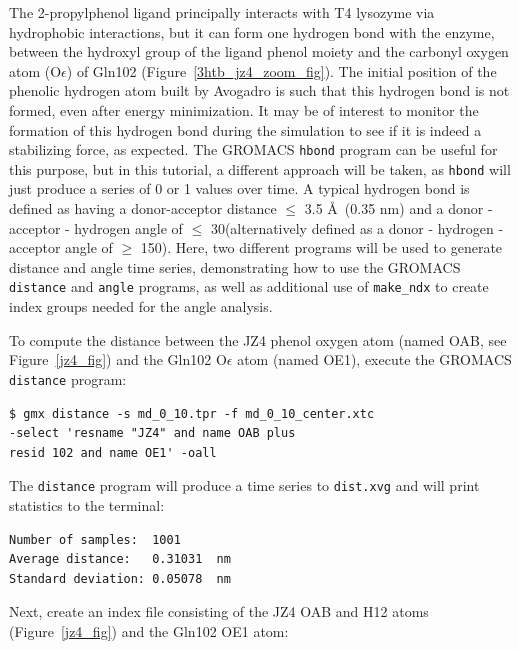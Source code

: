 \documentclass[9pt,tutorial]{livecoms}
\begin{document}
The 2-propylphenol ligand principally interacts with T4 lysozyme via hydrophobic interactions, but it can form one hydrogen bond with the enzyme, between the hydroxyl group of the ligand phenol moiety and the carbonyl oxygen atom (O$\epsilon$) of Gln102 (Figure~\ref{3htb_jz4_zoom_fig}). The initial position of the phenolic hydrogen atom built by Avogadro is such that this hydrogen bond is not formed, even after energy minimization. It may be of interest to monitor the formation of this hydrogen bond during the simulation to see if it is indeed a stabilizing force, as expected. The GROMACS \texttt{hbond} program can be useful for this purpose, but in this tutorial, a different approach will be taken, as \texttt{hbond} will just produce a series of 0 or 1 values over time. A typical hydrogen bond is defined as having a donor-acceptor distance $\le$ 3.5 \AA~(0.35 nm) and a donor - acceptor - hydrogen angle of $\le$ 30\textdegree (alternatively defined as a donor - hydrogen - acceptor angle of $\ge$ 150\textdegree). Here, two different programs will be used to generate distance and angle time series, demonstrating how to use the GROMACS \texttt{distance} and \texttt{angle} programs, as well as additional use of \texttt{make\_ndx} to create index groups needed for the angle analysis.

To compute the distance between the JZ4 phenol oxygen atom (named OAB, see Figure~\ref{jz4_fig}) and the Gln102 O$\epsilon$ atom (named OE1), execute the GROMACS \texttt{distance} program:

\begin{verbatim}
$ gmx distance -s md_0_10.tpr -f md_0_10_center.xtc
-select 'resname "JZ4" and name OAB plus 
resid 102 and name OE1' -oall
\end{verbatim}

The \texttt{distance} program will produce a time series to \texttt{dist.xvg} and will print statistics to the terminal:

\begin{verbatim}
Number of samples:  1001
Average distance:   0.31031  nm
Standard deviation: 0.05078  nm
\end{verbatim}

Next, create an index file consisting of the JZ4 OAB and H12 atoms (Figure~\ref{jz4_fig}) and the Gln102 OE1 atom:
\end{document}
